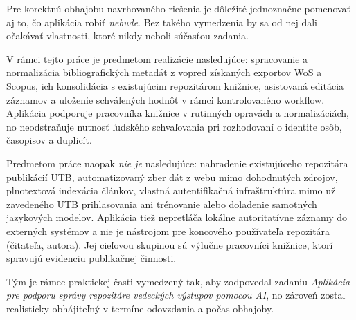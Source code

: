 Pre korektnú obhajobu navrhovaného riešenia je dôležité jednoznačne pomenovať aj to, čo aplikácia robiť \emph{nebude}. Bez takého vymedzenia by sa od nej dali očakávať vlastnosti, ktoré nikdy neboli súčasťou zadania.

V rámci tejto práce je predmetom realizácie nasledujúce: spracovanie a normalizácia bibliografických metadát z vopred získaných exportov WoS a Scopus, ich konsolidácia s existujúcim repozitárom knižnice, asistovaná editácia záznamov a uloženie schválených hodnôt v rámci kontrolovaného workflow. Aplikácia podporuje pracovníka knižnice v rutinných opravách a normalizáciách, no neodstraňuje nutnosť ľudského schvaľovania pri rozhodovaní o identite osôb, časopisov a duplicít.

Predmetom práce naopak \emph{nie je} nasledujúce: nahradenie existujúceho repozitára publikácií UTB, automatizovaný zber dát z webu mimo dohodnutých zdrojov, plnotextová indexácia článkov, vlastná autentifikačná infraštruktúra mimo už zavedeného UTB prihlasovania ani trénovanie alebo doladenie samotných jazykových modelov. Aplikácia tiež nepretláča lokálne autoritatívne záznamy do externých systémov a nie je nástrojom pre koncového používateľa repozitára (čitateľa, autora). Jej cieľovou skupinou sú výlučne pracovníci knižnice, ktorí spravujú evidenciu publikačnej činnosti.

Tým je rámec praktickej časti vymedzený tak, aby zodpovedal zadaniu \emph{Aplikácia pre podporu správy repozitáre vedeckých výstupov pomocou AI}, no zároveň zostal realisticky obhájiteľný v termíne odovzdania a počas obhajoby.